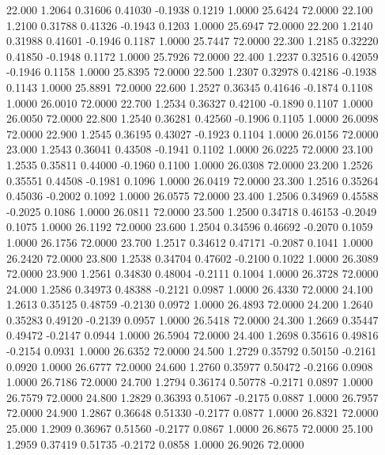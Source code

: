   22.000   1.2064   0.31606   0.41030  -0.1938   0.1219   1.0000  25.6424  72.0000
  22.100   1.2100   0.31788   0.41326  -0.1943   0.1203   1.0000  25.6947  72.0000
  22.200   1.2140   0.31988   0.41601  -0.1946   0.1187   1.0000  25.7447  72.0000
  22.300   1.2185   0.32220   0.41850  -0.1948   0.1172   1.0000  25.7926  72.0000
  22.400   1.2237   0.32516   0.42059  -0.1946   0.1158   1.0000  25.8395  72.0000
  22.500   1.2307   0.32978   0.42186  -0.1938   0.1143   1.0000  25.8891  72.0000
  22.600   1.2527   0.36345   0.41646  -0.1874   0.1108   1.0000  26.0010  72.0000
  22.700   1.2534   0.36327   0.42100  -0.1890   0.1107   1.0000  26.0050  72.0000
  22.800   1.2540   0.36281   0.42560  -0.1906   0.1105   1.0000  26.0098  72.0000
  22.900   1.2545   0.36195   0.43027  -0.1923   0.1104   1.0000  26.0156  72.0000
  23.000   1.2543   0.36041   0.43508  -0.1941   0.1102   1.0000  26.0225  72.0000
  23.100   1.2535   0.35811   0.44000  -0.1960   0.1100   1.0000  26.0308  72.0000
  23.200   1.2526   0.35551   0.44508  -0.1981   0.1096   1.0000  26.0419  72.0000
  23.300   1.2516   0.35264   0.45036  -0.2002   0.1092   1.0000  26.0575  72.0000
  23.400   1.2506   0.34969   0.45588  -0.2025   0.1086   1.0000  26.0811  72.0000
  23.500   1.2500   0.34718   0.46153  -0.2049   0.1075   1.0000  26.1192  72.0000
  23.600   1.2504   0.34596   0.46692  -0.2070   0.1059   1.0000  26.1756  72.0000
  23.700   1.2517   0.34612   0.47171  -0.2087   0.1041   1.0000  26.2420  72.0000
  23.800   1.2538   0.34704   0.47602  -0.2100   0.1022   1.0000  26.3089  72.0000
  23.900   1.2561   0.34830   0.48004  -0.2111   0.1004   1.0000  26.3728  72.0000
  24.000   1.2586   0.34973   0.48388  -0.2121   0.0987   1.0000  26.4330  72.0000
  24.100   1.2613   0.35125   0.48759  -0.2130   0.0972   1.0000  26.4893  72.0000
  24.200   1.2640   0.35283   0.49120  -0.2139   0.0957   1.0000  26.5418  72.0000
  24.300   1.2669   0.35447   0.49472  -0.2147   0.0944   1.0000  26.5904  72.0000
  24.400   1.2698   0.35616   0.49816  -0.2154   0.0931   1.0000  26.6352  72.0000
  24.500   1.2729   0.35792   0.50150  -0.2161   0.0920   1.0000  26.6777  72.0000
  24.600   1.2760   0.35977   0.50472  -0.2166   0.0908   1.0000  26.7186  72.0000
  24.700   1.2794   0.36174   0.50778  -0.2171   0.0897   1.0000  26.7579  72.0000
  24.800   1.2829   0.36393   0.51067  -0.2175   0.0887   1.0000  26.7957  72.0000
  24.900   1.2867   0.36648   0.51330  -0.2177   0.0877   1.0000  26.8321  72.0000
  25.000   1.2909   0.36967   0.51560  -0.2177   0.0867   1.0000  26.8675  72.0000
  25.100   1.2959   0.37419   0.51735  -0.2172   0.0858   1.0000  26.9026  72.0000
